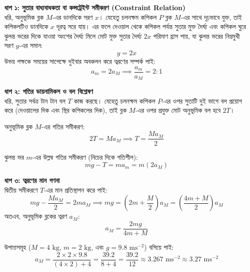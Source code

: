 \documentclass[12pt, a4paper]{article}
\begin{document}
\begin{tcolorbox}[solutionbox={সমাধান (Solution)}]
\noindent
\textbf{ধাপ ১: সুতার বাধ্যবাধকতা বা কন্সট্রেইন্ট সমীকরণ (Constraint Relation)} \\
ধরি, অনুভূমিক ব্লক $M$-এর ডানদিকে সরণ $x$। যেহেতু চলনক্ষম কপিকল $P$ ব্লক $M$-এর সাথে দৃঢ়ভাবে যুক্ত, তাই কপিকলটিও ডানদিকে $x$ দূরত্ব সরে যায়। এর ফলে দেওয়াল থেকে কপিকল পর্যন্ত সুতার মুক্ত দৈর্ঘ্য এবং কপিকল ঘুরে ঝুলন্ত ভরের দিকে যাওয়া অংশের দৈর্ঘ্য মিলে মোট মুক্ত সুতার দৈর্ঘ্য $2x$ পরিমাণ হ্রাস পায়, যা ঝুলন্ত ভরের নিম্নমুখী সরণ $y$-এর সমান:
\[ y = 2x \]
উভয় পক্ষকে সময়ের সাপেক্ষে দুইবার অবকলন করে ত্বরণের সম্পর্ক পাই:
\[ a_m = 2 a_M \implies \frac{a_m}{a_M} = 2 : 1 \]

\vspace{0.5em}
\noindent
\textbf{ধাপ ২: গতির ডায়নামিকস ও বল বিশ্লেষণ} \\
ধরি, সুতার সর্বত্র টান টান বল $T$ কাজ করছে। যেহেতু চলনক্ষম কপিকল $P$-এর ওপর সুতাটি দুই ভাগে বল প্রয়োগ করে (দেওয়ালের দিক এবং স্থির কপিকলের দিক), তাই ব্লক $M$-এর ওপর প্রযুক্ত মোট অনুভূমিক বল হবে $2T$।

অনুভূমিক ব্লক $M$-এর গতির সমীকরণ:
\[ 2T = M a_M \implies T = \frac{M a_M}{2} \]

ঝুলন্ত ভর $m$-এর উল্লম্ব গতির সমীকরণ (নিচের দিকে গতিশীল):
\[ m g - T = m a_m = m (2 a_M) \]

\vspace{0.5em}
\noindent
\textbf{ধাপ ৩: ত্বরণের মান গণনা} \\
দ্বিতীয় সমীকরণে $T$-এর মান প্রতিস্থাপন করে পাই:
\[ m g - \frac{M a_M}{2} = 2 m a_M \implies m g = \left(2m + \frac{M}{2}\right) a_M = \left(\frac{4m + M}{2}\right) a_M \]
অতএব, অনুভূমিক ব্লকের ত্বরণ $a_M$:
\[ a_M = \frac{2 m g}{4m + M} \]

উপাত্তসমূহ ($M = 4\text{ kg}$, $m = 2\text{ kg}$, এবং $g = 9.8\text{ ms}^{-2}$) বসিয়ে পাই:
\[ a_M = \frac{2 \times 2 \times 9.8}{(4 \times 2) + 4} = \frac{39.2}{8 + 4} = \frac{39.2}{12} \approx 3.267\text{ ms}^{-2} \approx 3.27\text{ ms}^{-2} \]
\end{tcolorbox}

\newpage
\end{document}
